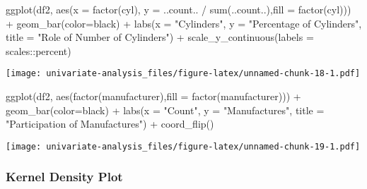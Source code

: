 \documentclass[
]{article}
\newenvironment{Shaded}{\begin{snugshade}}{\end{snugshade}}
\newcommand{\AttributeTok}[1]{\textcolor[rgb]{0.77,0.63,0.00}{#1}}
\newcommand{\FunctionTok}[1]{\textcolor[rgb]{0.00,0.00,0.00}{#1}}
\newcommand{\NormalTok}[1]{#1}
\newcommand{\SpecialCharTok}[1]{\textcolor[rgb]{0.00,0.00,0.00}{#1}}
\newcommand{\StringTok}[1]{\textcolor[rgb]{0.31,0.60,0.02}{#1}}
\begin{document}
\begin{Shaded}
\begin{Highlighting}[]
\FunctionTok{ggplot}\NormalTok{(df2, }
       \FunctionTok{aes}\NormalTok{(}\AttributeTok{x =} \FunctionTok{factor}\NormalTok{(cyl), }\AttributeTok{y =}\NormalTok{ ..count.. }\SpecialCharTok{/} \FunctionTok{sum}\NormalTok{(..count..),}\AttributeTok{fill =} \FunctionTok{factor}\NormalTok{(cyl))) }\SpecialCharTok{+} 
       \FunctionTok{geom\_bar}\NormalTok{(}\AttributeTok{color=}\StringTok{\textquotesingle{}black\textquotesingle{}}\NormalTok{) }\SpecialCharTok{+} 
       \FunctionTok{labs}\NormalTok{(}\AttributeTok{x =} \StringTok{"Cylinders"}\NormalTok{, }\AttributeTok{y =} \StringTok{"Percentage of Cylinders"}\NormalTok{, }\AttributeTok{title  =} \StringTok{"Role of Number of Cylinders"}\NormalTok{) }\SpecialCharTok{+}
       \FunctionTok{scale\_y\_continuous}\NormalTok{(}\AttributeTok{labels =}\NormalTok{ scales}\SpecialCharTok{::}\NormalTok{percent)}
\end{Highlighting}
\end{Shaded}

\texttt{[image: univariate-analysis\_files/figure-latex/unnamed-chunk-18-1.pdf]}

\begin{Shaded}
\begin{Highlighting}[]
\FunctionTok{ggplot}\NormalTok{(df2, }\FunctionTok{aes}\NormalTok{(}\FunctionTok{factor}\NormalTok{(manufacturer),}\AttributeTok{fill =} \FunctionTok{factor}\NormalTok{(manufacturer))) }\SpecialCharTok{+}
      \FunctionTok{geom\_bar}\NormalTok{(}\AttributeTok{color=}\StringTok{\textquotesingle{}black\textquotesingle{}}\NormalTok{) }\SpecialCharTok{+}
      \FunctionTok{labs}\NormalTok{(}\AttributeTok{x =} \StringTok{"Count"}\NormalTok{, }\AttributeTok{y =} \StringTok{"Manufactures"}\NormalTok{, }\AttributeTok{title  =} \StringTok{"Participation of Manufactures"}\NormalTok{) }\SpecialCharTok{+} 
      \FunctionTok{coord\_flip}\NormalTok{()}
\end{Highlighting}
\end{Shaded}

\texttt{[image: univariate-analysis\_files/figure-latex/unnamed-chunk-19-1.pdf]}

\hypertarget{kernel-density-plot-1}{%
\subsubsection{Kernel Density Plot}\label{kernel-density-plot-1}}
\end{document}
